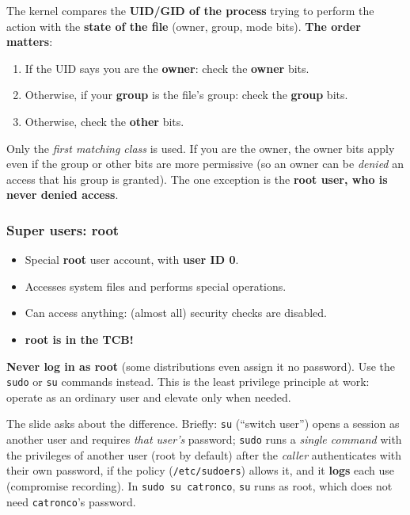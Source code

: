 The kernel compares the \textbf{UID/GID of the process} trying to perform the action with the \textbf{state of the file} (owner, group, mode bits). \textbf{The order matters}:
\begin{enumerate}
    \item If the UID says you are the \textbf{owner}: check the \textbf{owner} bits.
    \item Otherwise, if your \textbf{group} is the file's group: check the \textbf{group} bits.
    \item Otherwise, check the \textbf{other} bits.
\end{enumerate}

\begin{remark}
Only the \emph{first matching class} is used. If you are the owner, the owner bits apply even if the group or other bits are more permissive (so an owner can be \emph{denied} an access that his group is granted). The one exception is the \textbf{root user, who is never denied access}.
\end{remark}

\subsubsection{Super users: root}

\begin{itemize}
    \item Special \textbf{root} user account, with \textbf{user ID 0}.
    \item Accesses system files and performs special operations.
    \item Can access anything: (almost all) security checks are disabled.
    \item \textbf{root is in the TCB!}
\end{itemize}

\textbf{Never log in as root} (some distributions even assign it no password). Use the \texttt{sudo} or \texttt{su} commands instead. This is the least privilege principle at work: operate as an ordinary user and elevate only when needed.

\begin{remark}
The slide asks about the difference. Briefly: \texttt{su} (``switch user'') opens a session as another user and requires \emph{that user's} password; \texttt{sudo} runs a \emph{single command} with the privileges of another user (root by default) after the \emph{caller} authenticates with their own password, if the policy (\texttt{/etc/sudoers}) allows it, and it \textbf{logs} each use (compromise recording). In \texttt{sudo su catronco}, \texttt{su} runs as root, which does not need \texttt{catronco}'s password.
\end{remark}

